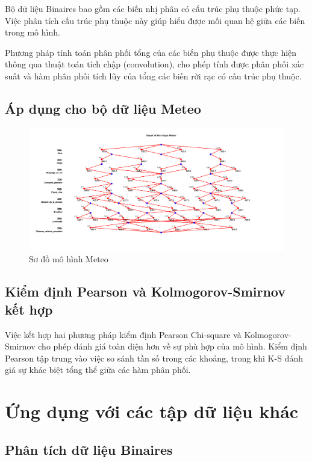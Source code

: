 Bộ dữ liệu Binaires bao gồm các biến nhị phân có cấu trúc phụ thuộc phức tạp. Việc phân tích cấu trúc phụ thuộc này giúp hiểu được mối quan hệ giữa các biến trong mô hình.

Phương pháp tính toán phân phối tổng của các biến phụ thuộc được thực hiện thông qua thuật toán tích chập (convolution), cho phép tính được phân phối xác suất và hàm phân phối tích lũy của tổng các biến rời rạc có cấu trúc phụ thuộc.

\subsection{Áp dụng cho bộ dữ liệu Meteo}

\begin{figure}[h!]
    \centering
    \includegraphics[width=1.2\linewidth]{../../assets/images/fig_Meteo.png}
    \caption{Sơ đồ mô hình Meteo}
    \label{fig:Meteo}
\end{figure}



\subsection{Kiểm định Pearson và Kolmogorov-Smirnov kết hợp}

Việc kết hợp hai phương pháp kiểm định Pearson Chi-square và Kolmogorov-Smirnov cho phép đánh giá toàn diện hơn về sự phù hợp của mô hình. Kiểm định Pearson tập trung vào việc so sánh tần số trong các khoảng, trong khi K-S đánh giá sự khác biệt tổng thể giữa các hàm phân phối.

\section{Ứng dụng với các tập dữ liệu khác}

\subsection{Phân tích dữ liệu Binaires}

